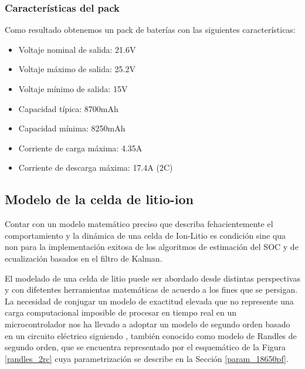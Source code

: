 \documentclass[10pt, a4paper]{article}
\begin{document}
\subsubsection{Caracter\'isticas del pack}\label{caract_pack}

Como resultado obtenemos un pack de bater\'ias con las siguientes
caracter\'isticas:

\begin{itemize}
    \item Voltaje nominal de salida: 21.6V
    \item Voltaje m\'aximo de salida: 25.2V
    \item Voltaje m\'inimo de salida: 15V
    \item Capacidad t\'ipica: 8700mAh
    \item Capacidad m\'inima: 8250mAh
    \item Corriente de carga m\'axima: 4.35A
    \item Corriente de descarga m\'axima: 17.4A (2C)
\end{itemize}

\subsection{Modelo de la celda de litio-ion}\label{dev_batt_model}

Contar con un modelo matemático preciso que describa fehacientemente el
comportamiento y la dinámica de una celda de Ion-Litio es condición sine qua non
para la implementación exitosa de los algoritmos de estimación del
\acrshort{SOC} y de ecualización basados en el filtro de Kalman.

El modelado de una celda de litio puede ser abordado desde distintas
perspectivas y con difetentes herramientas matemáticas de acuerdo a los fines
que se persigan. La necesidad de conjugar un modelo de exactitud elevada que no
represente una carga computacional imposible de procesar en tiempo real en un
microcontrolador nos ha llevado a adoptar un modelo de segundo orden basado en
un circuito eléctrico siguiendo \cite{spagnol_kalman}, también conocido como
modelo de Randles de segundo orden, que se encuentra representado por el
esquem\'atico de la Figura \ref{randles_2rc} cuya parametrizaci\'on se describe
en la Secci\'on \ref{param_18650pf}.
\end{document}
